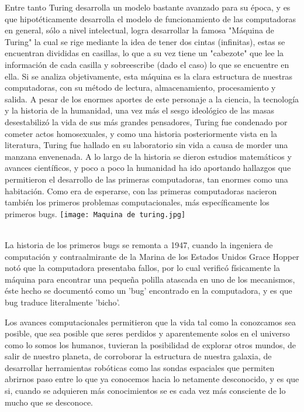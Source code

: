 \documentclass{article}
\begin{document}
Entre tanto Turing desarrolla un modelo bastante avanzado para su época, y es que hipotéticamente desarrolla el modelo de funcionamiento de las computadoras en general, sólo a nivel intelectual, logra desarrollar la famosa "Máquina de Turing" la cual se rige mediante la idea de tener dos cintas (infinitas), estas se encuentran divididas en casillas, lo que a su vez tiene un "cabezote" que lee la información de cada casilla y sobreescribe (dado el caso) lo que se encuentre en ella.
Si se analiza objetivamente, esta máquina es la clara estructura de nuestras computadoras, con su método de lectura, almacenamiento, procesamiento y salida.
A pesar de los enormes aportes de este personaje a la ciencia, la tecnología y la historia de la humanidad, una vez más el sesgo ideológico de las masas desestabilizó la vida de sus más grandes pensadores, Turing fue condenado por cometer actos homosexuales, y como una historia posteriormente vista en la literatura, Turing fue hallado en su laboratorio sin vida a causa de morder una manzana envenenada.
\newpage
A lo largo de la historia se dieron estudios matemáticos y avances científicos, y poco a poco la humanidad ha ido aportando hallazgos que permitieron el desarrollo de las primeras computadoras, tan enormes como una habitación. Como era de esperarse, con las primeras computadoras nacieron también los primeros problemas computacionales, más específicamente los primeros bugs.
\texttt{[image: Maquina de turing.jpg]}
\label{fig:Maquina de turing}

\\
La historia de los primeros bugs se remonta a 1947, cuando la ingeniera de computación y contraalmirante de la Marina de los Estados Unidos Grace Hopper notó que la computadora presentaba fallos, por lo cual verificó físicamente la máquina para encontrar una pequeña polilla atascada en uno de los mecanismos, éste hecho se documentó como un 'bug' encontrado en la computadora, y es que bug traduce literalmente 'bicho'.

Los avances computacionales permitieron que la vida tal como la conozcamos sea posible, que sea posible que seres perdidos y aparentemente solos en el universo como lo somos los humanos, tuvieran la posibilidad de explorar otros mundos, de salir de nuestro planeta, de corroborar la estructura de nuestra galaxia, de desarrollar herramientas robóticas como las sondas espaciales que permiten abrirnos paso entre lo que ya conocemos hacia lo netamente desconocido, y es que si, cuando se adquieren más conocimientos se es cada vez más consciente de lo mucho que se desconoce.
\newpage
\end{document}
